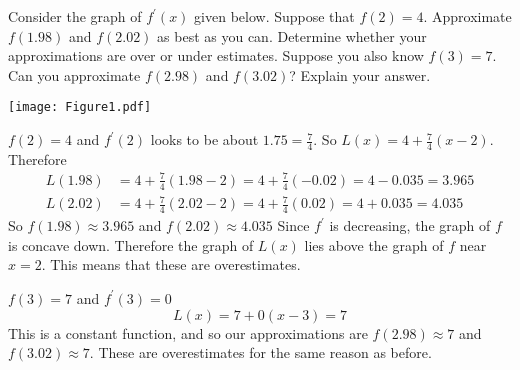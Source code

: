 \documentclass[nooutcomes]{ximera}
\begin{document}
\begin{problem}
Consider the graph of $f^\prime (x)$ given below.  Suppose that $f(2) = 4$.  Approximate 
$f(1.98)$ and $f(2.02)$ as best as you can.  Determine whether your approximations are over or under estimates.  
Suppose you also know $f(3) = 7$.  
Can you approximate $f(2.98)$ and $f(3.02)$?  
Explain your answer.

	\begin{image}
	\texttt{[image: Figure1.pdf]}
	\end{image}
	
		\begin{freeResponse}
		$f(2) = 4$ and $f^\prime (2)$ looks to be about $1.75 = \frac{7}{4}$.  So $L(x) = 4 + \frac{7}{4} (x-2)$.  Therefore
			\begin{align*}
			L(1.98) &= 4 + \frac{7}{4} (1.98-2) = 4 + \frac{7}{4} (-0.02) = 4-0.035 = 3.965 \\
			L(2.02) &= 4 + \frac{7}{4} (2.02-2) = 4 + \frac{7}{4} (0.02) = 4+0.035 = 4.035
			\end{align*}
		So $f(1.98)\approx 3.965$ and $f(2.02)\approx 4.035$ 
Since $f^\prime$ is decreasing, the graph of $f$ is concave down.  Therefore the graph of $L(x)$ lies above the graph of $f$ near $x=2$.  This means that these are overestimates.

		$f(3)=7$ and $f^\prime (3)=0$ 
		$$ L(x) =7+0(x-3) = 7$$
		This is a constant function, and so our approximations are $f(2.98)\approx 7$ and $f(3.02)\approx 7$. These are overestimates for the same reason as before.
		\end{freeResponse}
		
		
		

\end{problem}
	
	
	
	
	
	
	
	
			
			
\end{document}
